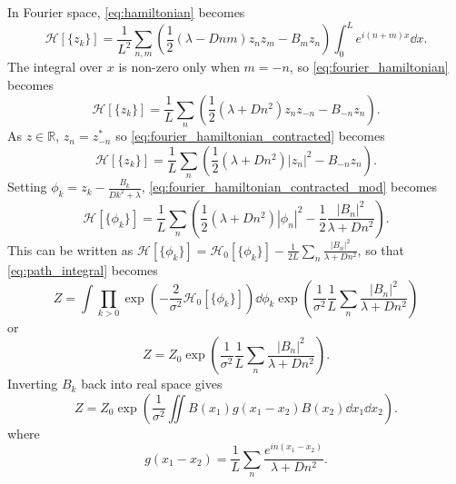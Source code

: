  In Fourier space, \cref{eq:hamiltonian} becomes
 \begin{equation}
   \label{eq:fourier_hamiltonian}
   \mathcal{H}[\{z_k\}] = \frac{1}{L^2}\sum_{n,m}\left(\frac{1}{2}\left(\lambda  - D nm\right) z_nz_m - B_mz_n\right)\int_0^L  e^{i(n+m)x}\dd{x}.
 \end{equation}
 The integral over $x$ is non-zero only when $m = -n$, so \cref{eq:fourier_hamiltonian} becomes
 \begin{equation}
   \label{eq:fourier_hamiltonian_contracted}
   \mathcal{H}[\{z_k\}] = \frac{1}{L}\sum_{n} \left(\frac{1}{2}\left(\lambda  + D n^2\right) z_nz_{-n} - B_{-n}z_{n}\right).
 \end{equation}
 As $z \in \mathbb{R}$, $z_n = z_{-n}^*$ so \cref{eq:fourier_hamiltonian_contracted} becomes
 \begin{equation}
   \label{eq:fourier_hamiltonian_contracted_mod}
   \mathcal{H}[\{z_k\}] = \frac{1}{L}\sum_{n} \left(\frac{1}{2}\left(\lambda  + D n^2\right) \left|z_n\right|^2- B_{-n}z_{n}\right).
 \end{equation}
 Setting $\phi_k = z_k - \frac{B_k}{Dk^2 + \lambda}$, \cref{eq:fourier_hamiltonian_contracted_mod} becomes
 \begin{equation}
   \label{eq:fourier_phi}
   \mathcal{H}[\{\phi_k\}] =  \frac{1}{L}\sum_{n} \left(\frac{1}{2}\left(\lambda + Dn^2\right) \left|\phi_n\right|^2 - \frac{1}{2}\frac{\left|B_n\right|^2}{\lambda + Dn^2}\right).
 \end{equation}
 This can be written as $\mathcal{H}[\{\phi_k\}] = \mathcal{H}_0[\{\phi_k\}] - \frac{1}{2L}\sum_{n}\frac{\left|B_n\right|^2}{\lambda + Dn^2}$, so that \cref{eq:path_integral} becomes
 \begin{equation}
   \label{eq:path_integral_factored}
   Z = \int \prod_{k>0} \exp \left(-\frac{2}{\sigma^2} \mathcal{H}_0[\{\phi_k\}]\right) \dd{\phi_k}\exp\left(\frac{1}{\sigma^2} \frac{1}{L}\sum_{n}\frac{\left|B_n\right|^2}{\lambda + Dn^2}\right)
 \end{equation}
 or
 \begin{equation}
   \label{eq:path_integral_factored_Z0}
   Z = Z_0 \exp\left(\frac{1}{\sigma^2} \frac{1}{L}\sum_{n}\frac{\left|B_n\right|^2}{\lambda + Dn^2}\right).
 \end{equation}
 Inverting $B_k$ back into real space gives
 \begin{equation}
   \label{eq:path_integral_factored_Z0_real}
   Z = Z_0 \exp\left(\frac{1}{\sigma^2} \iint B(x_1) g(x_1 - x_2) B(x_2) \dd{x_1}\dd{x_2}\right).
 \end{equation}
 where
 \begin{equation}
   \label{eq:G_from_Z}
   g(x_1 - x_2) =  \frac{1}{L}\sum_{n} \frac{e^{in(x_1-x_2)}}{\lambda + Dn^2}. 
 \end{equation}
 
